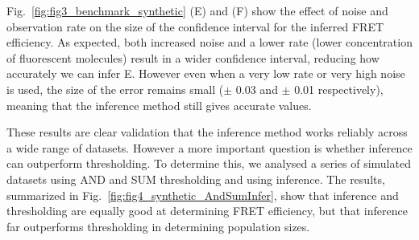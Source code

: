 Fig.~\ref{fig:fig3_benchmark_synthetic} (E) and (F) show the effect of noise and observation rate on the size of the confidence interval for the inferred FRET efficiency.  As expected, both increased noise and a lower rate (lower concentration of fluorescent molecules) result in a wider confidence interval, reducing how accurately we can infer E.  However even when a very low rate or very high noise is used, the size of the error remains small ($\pm$ 0.03 and $\pm$ 0.01 respectively), meaning that the inference method still gives accurate values.


These results are clear validation that the inference method works reliably across a wide range of datasets. However a more important question is whether inference can outperform thresholding. To determine this, we analysed a series of simulated datasets using AND and SUM thresholding and using inference.  The results, summarized in Fig.~\ref{fig:fig4_synthetic_AndSumInfer}, show that inference and thresholding are equally good at determining FRET efficiency, but that inference far outperforms thresholding in determining population sizes.

